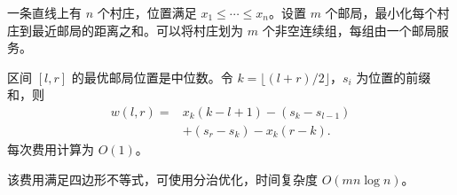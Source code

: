 一条直线上有 $n$ 个村庄，位置满足 $x_1\le\cdots\le x_n$。设置 $m$ 个邮局，最小化每个村庄到最近邮局的距离之和。可以将村庄划为 $m$ 个非空连续组，每组由一个邮局服务。

区间 $[l,r]$ 的最优邮局位置是中位数。令 $k=\lfloor(l+r)/2\rfloor$，$s_i$ 为位置的前缀和，则
\[
\begin{aligned}
w(l,r)={}&x_k(k-l+1)-(s_k-s_{l-1})\\
         &+(s_r-s_k)-x_k(r-k).
\end{aligned}
\]
每次费用计算为 $O(1)$。

该费用满足四边形不等式，可使用分治优化，时间复杂度 $O(mn\log n)$。
